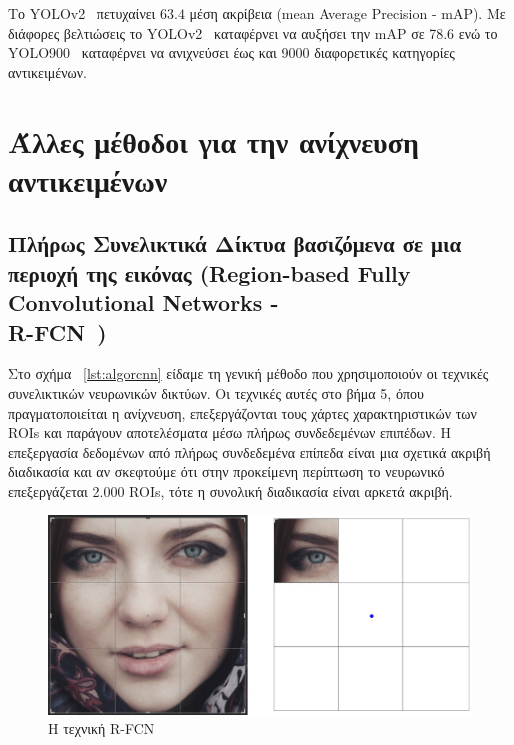 Το YOLOv2~\cite{7780460} πετυχαίνει $63.4$ μέση ακρίβεια (mean Average Precision - mAP).
Με διάφορες βελτιώσεις το YOLOv2~\cite{DBLP:journals/corr/RedmonF16} καταφέρνει να αυξήσει την mAP σε 78.6 ενώ το
YOLO900~\cite{DBLP:journals/corr/RedmonF16} καταφέρνει να ανιχνεύσει έως και 9000 διαφορετικές κατηγορίες αντικειμένων.



\section{Άλλες μέθοδοι για την ανίχνευση αντικειμένων}\label{sec:objmethods}


\subsection{Πλήρως Συνελικτικά Δίκτυα βασιζόμενα σε μια περιοχή της εικόνας
(Region-based Fully Convolutional Networks - \\R-FCN~\cite{DBLP:journals/corr/DaiLHS16})}\label{sec:rfcn}

Στο σχήμα ~\ref{lst:algorcnn} είδαμε τη γενική μέθοδο που χρησιμοποιούν οι
τεχνικές συνελικτικών νευρωνικών δικτύων. Οι τεχνικές αυτές στο βήμα 5, όπου
πραγματοποιείται η ανίχνευση, επεξεργάζονται τους χάρτες χαρακτηριστικών των
ROIs και παράγουν αποτελέσματα μέσω πλήρως συνδεδεμένων επιπέδων. Η επεξεργασία
δεδομένων από πλήρως συνδεδεμένα επίπεδα είναι μια σχετικά ακριβή διαδικασία και
αν σκεφτούμε ότι στην προκείμενη περίπτωση το νευρωνικό επεξεργάζεται 2.000 ROIs,
τότε η συνολική διαδικασία είναι αρκετά ακριβή.

\begin{figure}[htbp]
  \begin{center}
    \includegraphics[width=0.8\maxwidth]{../figures/rfcn.png}
    \caption{H τεχνική R-FCN\label{fig:fpn}}
   \end{center}
\end{figure}


